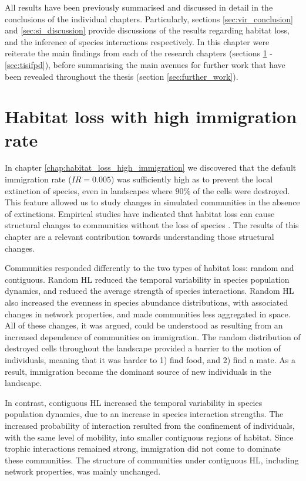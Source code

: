 
All results have been previously summarised and discussed in detail in the conclusions of the individual chapters. Particularly, sections \ref{sec:vir_conclusion} and \ref{sec:si_discussion} provide discussions of the results regarding habitat loss, and the inference of species interactions respectively. In this chapter were reiterate the main findings from each of the research chapters (sections \ref{sec:hl_hi} - \ref{sec:tisifpd}), before summarising the main avenues for further work that have been revealed throughout the thesis (section \ref{sec:further_work}).

\section{Habitat loss with high immigration rate}
\label{sec:hl_hi}

In  chapter \ref{chap:habitat_loss_high_immigration} we discovered that the default immigration rate ($IR=0.005$) was sufficiently high as to prevent the local extinction of species, even in landscapes where $90\%$ of the cells were destroyed. This feature allowed us to study changes in simulated communities in the absence of extinctions. Empirical studies have indicated that habitat loss can cause structural changes to communities without the loss of species \cite{albrecht2007interaction,tylianakis2007habitat,hagen2012biodiversity}. The results of this chapter are a relevant contribution towards understanding those structural changes.

Communities responded differently to the two types of habitat loss: random and contiguous. Random HL reduced the temporal variability in species population dynamics, and reduced the average strength of species interactions. Random HL also increased the evenness in species abundance distributions, with associated changes in network properties, and made communities less aggregated in space. All of these changes, it was argued, could be understood as resulting from an increased dependence of communities on immigration. The random distribution of destroyed cells throughout the landscape provided a barrier to the motion of individuals, meaning that it was harder to 1) find food, and 2) find a mate. As a result, immigration became the dominant source of new individuals in the landscape.

In contrast, contiguous HL increased the temporal variability in species population dynamics, due to an increase in species interaction strengths. The increased probability of interaction resulted from the confinement of individuals, with the same level of mobility, into smaller contiguous regions of habitat. Since trophic interactions remained strong, immigration did not come to dominate these communities. The structure of communities under contiguous HL, including network properties, was mainly unchanged. 

